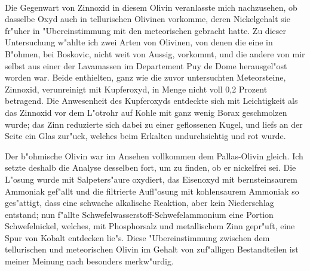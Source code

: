 \documentclass[a4paper, 11pt, oneside]{article}
\begin{document}
\paragraph{}
Die Gegenwart von Zinnoxid in diesem Olivin veranlasste mich nachzusehen, ob dasselbe Oxyd auch in tellurischen Olivinen vorkomme, deren Nickelgehalt sie fr"uher in "Ubereinstimmung mit den meteorischen gebracht hatte. Zu dieser Untersuchung w"ahlte ich zwei Arten von Olivinen, von denen die eine in B"ohmen, bei Boskovic, nicht weit von Aussig, vorkommt, und die andere von mir selbst aus einer der Lavamassen im Departement Puy de Dome herausgel"ost worden war. Beide enthielten, ganz wie die zuvor untersuchten Meteorsteine, Zinnoxid, verunreinigt mit Kupferoxyd, in Menge nicht voll 0,2 Prozent betragend. Die Anwesenheit des Kupferoxyds entdeckte sich mit Leichtigkeit als das Zinnoxid vor dem L"otrohr auf Kohle mit ganz wenig Borax geschmolzen wurde; das Zinn reduzierte sich dabei zu einer geflossenen Kugel, und liefs an der Seite ein Glas zur"uck, welches beim Erkalten undurchsichtig und rot wurde.

Der b"ohmische Olivin war im Ansehen vollkommen dem Pallas-Olivin gleich. Ich setzte deshalb die Analyse desselben fort, um zu finden, ob er nickelfrei sei. Die L"osung wurde mit Salpeters"aure oxydiert, das Eisenoxyd mit bernsteinsaurem Ammoniak gef"allt und die filtrierte Aufl"osung mit kohlensaurem Ammoniak so ges"attigt, dass eine schwache alkalische Reaktion, aber kein Niederschlag entstand; nun f"allte Schwefelwasserstoff-Schwefelammonium eine Portion Schwefelnickel, welches, mit Phosphorsalz und metallischem Zinn gepr"uft, eine Spur von Kobalt entdecken lie"s. Diese "Ubereinstimmung zwischen dem tellurischen und meteorischen Olivin im Gehalt von zuf"alligen Bestandteilen ist meiner Meinung nach besonders merkw"urdig.

\section{}
\end{document}
